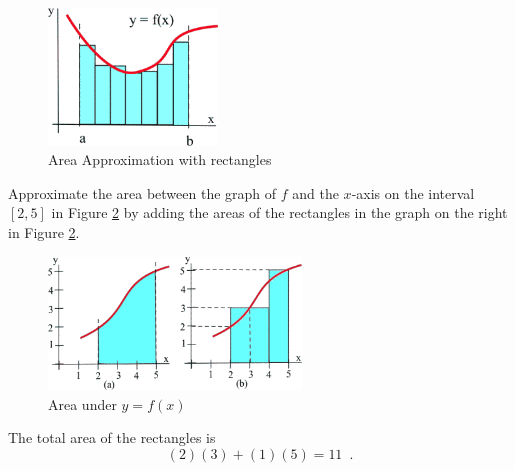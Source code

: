 \begin{figure}[!ht]
  \centering
    \includegraphics[width=0.4\textwidth]{img/chap5/image006.png}
    \caption{Area Approximation with rectangles}
    \label{fig:5-2-areaapprox}
\end{figure}
\begin{example}
Approximate the area between the graph of $f$ and the $x$-axis on the interval $[2, 5]$ in Figure \ref{fig:5-2-areaunderf} by adding the areas of the rectangles in the graph on the right in Figure \ref{fig:5-2-areaunderf}.

\begin{figure}[!ht]
  \centering
    \includegraphics[width=0.6\textwidth]{img/chap5/image007.png}
    \caption{Area under $y=f(x)$}
    \label{fig:5-2-areaunderf}
\end{figure}
\begin{solution}
The total area of the rectangles is
$$(2)(3)+(1)(5)=11 \enspace .$$
\end{solution}\end{example}

